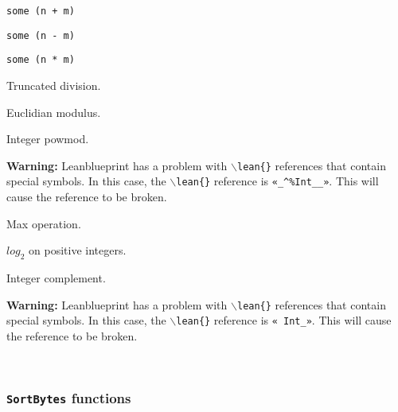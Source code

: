 \begin{definition}[+Int]\label{def:+Int}\leanok{}
\texttt{some (n + m)}
\end{definition}
\begin{definition}[-Int]\label{def:-Int}\leanok{}
\texttt{some (n - m)}
\end{definition}
\begin{definition}[*Int]\label{def:*Int}\leanok{}
\texttt{some (n * m)}
\end{definition}
\begin{definition}[/Int]\label{def:/Int}\leanok{}
Truncated division.
\end{definition}
\begin{definition}[modInt]\label{def:modInt}\leanok{}
Euclidian modulus.
\end{definition}
\begin{definition}[powMod]\label{powModInt}\leanok{}
Integer powmod.

\textbf{Warning:} Leanblueprint has a problem with \texttt{$\backslash$lean\{\}}
references that contain special symbols. In this case, the \texttt{$\backslash$lean\{\}}
reference is \texttt{«_^\%Int__»}. This will cause the reference to be broken.
\end{definition}
\begin{definition}[maxInt]\label{maxInt}\leanok{}
Max operation.
\end{definition}
\begin{definition}\label{log2Int}\leanok{}
$log_2$ on positive integers.
\end{definition}
\begin{definition}[notInt]\label{notInt}\leanok{}%
Integer complement.

\textbf{Warning:} Leanblueprint has a problem with \texttt{$\backslash$lean\{\}}
references that contain special symbols. In this case, the \texttt{$\backslash$lean\{\}}
reference is \texttt{«~Int_»}. This will cause the reference to be broken.
\end{definition}

\\
\subsubsection{\texttt{SortBytes} functions}

